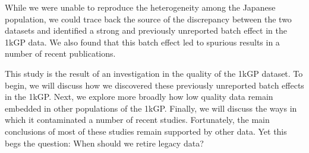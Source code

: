 \documentclass[9pt,lineno]{elife}
\begin{document}
While we were unable to reproduce the heterogeneity among the Japanese population, we could trace back the source of the discrepancy between the two datasets and identified a strong and previously unreported batch effect in the 1kGP data.
We also found that this batch effect led to spurious results in a number of recent publications. 

This study is the result of an investigation in the quality of the 1kGP dataset. 
To begin, we will discuss how we discovered these previously unreported batch effects in the 1kGP. 
Next, we explore more broadly how low quality data remain embedded in other populations of the 1kGP. 
Finally, we will discuss the ways in which it contaminated a number of recent studies.
Fortunately, the main conclusions of most of these studies remain supported by other data.
Yet this begs the question: When should we retire legacy data?
\end{document}
